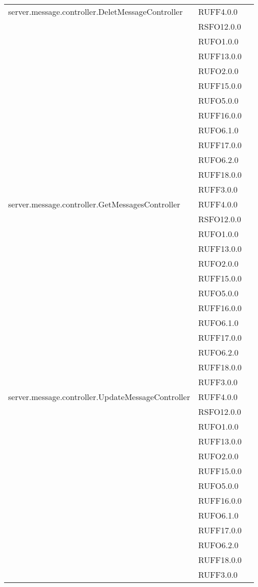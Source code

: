 \begin{center}
\begin{longtable}{lp{}l}
server.message.controller.DeletMessageController & RUFF4.0.0 \\
 & RSFO12.0.0 \\
 & RUFO1.0.0 \\
 & RUFF13.0.0 \\
 & RUFO2.0.0 \\
 & RUFF15.0.0 \\
 & RUFO5.0.0 \\
 & RUFF16.0.0 \\
 & RUFO6.1.0 \\
 & RUFF17.0.0 \\
 & RUFO6.2.0 \\
 & RUFF18.0.0 \\
 & RUFF3.0.0 \\
server.message.controller.GetMessagesController & RUFF4.0.0 \\
 & RSFO12.0.0 \\
 & RUFO1.0.0 \\
 & RUFF13.0.0 \\
 & RUFO2.0.0 \\
 & RUFF15.0.0 \\
 & RUFO5.0.0 \\
 & RUFF16.0.0 \\
 & RUFO6.1.0 \\
 & RUFF17.0.0 \\
 & RUFO6.2.0 \\
 & RUFF18.0.0 \\
 & RUFF3.0.0 \\
server.message.controller.UpdateMessageController & RUFF4.0.0 \\
 & RSFO12.0.0 \\
 & RUFO1.0.0 \\
 & RUFF13.0.0 \\
 & RUFO2.0.0 \\
 & RUFF15.0.0 \\
 & RUFO5.0.0 \\
 & RUFF16.0.0 \\
 & RUFO6.1.0 \\
 & RUFF17.0.0 \\
 & RUFO6.2.0 \\
 & RUFF18.0.0 \\
 & RUFF3.0.0 \\

\bottomrule
\end{longtable}
\end{center}


